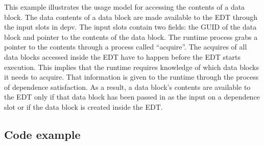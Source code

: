 This example illustrates the usage model for accessing the contents of a data block.
The data contents of a data block are made available to the EDT through the input slots in depv.
The input slots contain two fields: the GUID of the data block and pointer to the contents of the data block.
The runtime process grabs a pointer to the contents through a process called ``acquire''.
The acquires of all data blocks accessed inside the EDT have to happen
before the EDT starts execution. This implies that the runtime requires knowledge of
which data blocks it needs to acquire. That information is given to the runtime through
the process of dependence satisfaction. As a result, a data block's contents are available
to the EDT only if that data block has been passed in as the input on a dependence slot or
if the data block is created inside the EDT.
\subsection{Code example}
